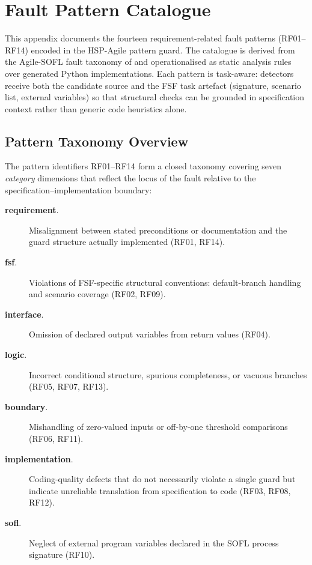 \chapter{Fault Pattern Catalogue}
\label{app:patterns}

This appendix documents the fourteen requirement-related fault patterns (RF01--RF14)
encoded in the HSP-Agile pattern guard.  The catalogue is derived from the
Agile-SOFL fault taxonomy of \citet{li2023iet_faultprevention} and operationalised as
static analysis rules over generated Python implementations.  Each pattern is
task-aware: detectors receive both the candidate source and the FSF task
artefact (signature, scenario list, external variables) so that structural
checks can be grounded in specification context rather than generic code
heuristics alone.

\section{Pattern Taxonomy Overview}
\label{sec:pat:taxonomy}

The pattern identifiers RF01--RF14 form a closed taxonomy covering seven
\emph{category} dimensions that reflect the locus of the fault relative to
the specification--implementation boundary:

\begin{description}
  \item[\textbf{requirement}.]
        Misalignment between stated preconditions or documentation and the
        guard structure actually implemented (RF01, RF14).
  \item[\textbf{fsf}.]
        Violations of FSF-specific structural conventions: default-branch
        handling and scenario coverage (RF02, RF09).
  \item[\textbf{interface}.]
        Omission of declared output variables from return values (RF04).
  \item[\textbf{logic}.]
        Incorrect conditional structure, spurious completeness, or vacuous
        branches (RF05, RF07, RF13).
  \item[\textbf{boundary}.]
        Mishandling of zero-valued inputs or off-by-one threshold comparisons
        (RF06, RF11).
  \item[\textbf{implementation}.]
        Coding-quality defects that do not necessarily violate a single guard
        but indicate unreliable translation from specification to code
        (RF03, RF08, RF12).
  \item[\textbf{sofl}.]
        Neglect of external program variables declared in the SOFL process
        signature (RF10).
\end{description}

